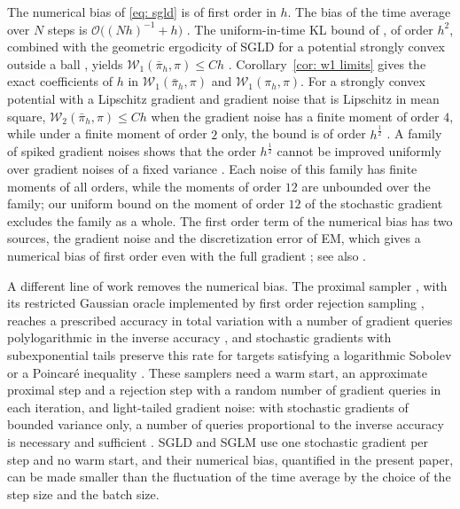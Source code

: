 \documentclass{article}
\newcommand{\Le}{\leqslant}
\numberwithin{equation}{section}
\begin{document}
The numerical bias of \eqref{eq: sgld} is of first order in $h$. The bias of the time average over $N$ steps is $\mathcal O\bigl( (Nh)^{-1} + h \bigr)$ \citep[Theorem~9]{vollmer2016exploration}. The uniform-in-time KL bound of \citep[Corollary~3.1]{li2022sharp}, of order $h^2$, combined with the geometric ergodicity of SGLD for a potential strongly convex outside a ball \citep{li2024geometric}, yields $\mathcal W_1(\bar\pi_h, \pi) \Le Ch$ \citep[Section~5.1]{li2022sharp}. Corollary~\ref{cor: w1 limits} gives the exact coefficients of $h$ in $\mathcal W_1(\bar\pi_h, \pi)$ and $\mathcal W_1(\pi_h, \pi)$. For a strongly convex potential with a Lipschitz gradient and gradient noise that is Lipschitz in mean square, $\mathcal W_2(\bar\pi_h, \pi) \Le Ch$ when the gradient noise has a finite moment of order $4$, while under a finite moment of order $2$ only, the bound is of order $h^{\frac12}$ \citep[Theorem~1]{paulin2026sgld}. A family of spiked gradient noises shows that the order $h^{\frac12}$ cannot be improved uniformly over gradient noises of a fixed variance \citep[Lemma~1]{paulin2026sgld}. Each noise of this family has finite moments of all orders, while the moments of order $12$ are unbounded over the family; our uniform bound on the moment of order $12$ of the stochastic gradient excludes the family as a whole. The first order term of the numerical bias has two sources, the gradient noise and the discretization error of EM, which gives a numerical bias of first order even with the full gradient \citep{talay1990expansion}; see also \citep[Section~4.1]{vollmer2016exploration}.

A different line of work removes the numerical bias. The proximal sampler \citep{lee2021structured, chen2022improved}, with its restricted Gaussian oracle implemented by first order rejection sampling \citep{chen2026high}, reaches a prescribed accuracy in total variation with a number of gradient queries polylogarithmic in the inverse accuracy \citep{altschuler2024faster, chen2026high}, and stochastic gradients with subexponential tails preserve this rate for targets satisfying a logarithmic Sobolev or a Poincar\'e inequality \citep{chen2026stochastic}. These samplers need a warm start, an approximate proximal step and a rejection step with a random number of gradient queries in each iteration, and light-tailed gradient noise: with stochastic gradients of bounded variance only, a number of queries proportional to the inverse accuracy is necessary and sufficient \citep{chen2026stochastic}. SGLD and SGLM use one stochastic gradient per step and no warm start, and their numerical bias, quantified in the present paper, can be made smaller than the fluctuation of the time average by the choice of the step size and the batch size.
\end{document}
